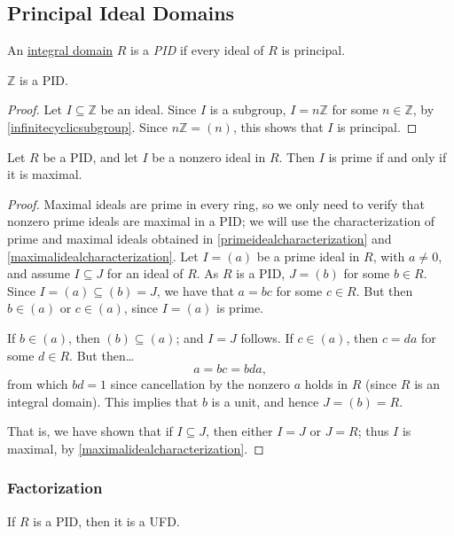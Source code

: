 \subsection{Principal Ideal Domains}\label{principalidealdomains}
An \hyperref[integraldomain]{integral domain} $R$ is a \emph{PID} if every ideal of $R$ is principal.

\begin{proposition}
$\mathbb{Z}$ is a PID.
\end{proposition}

\begin{proof}
Let $I \subseteq \mathbb{Z}$ be an ideal. Since $I$ is a subgroup, $I = n\mathbb{Z}$ for some $n \in \mathbb{Z}$, by
\ref{infinitecyclicsubgroup}. Since $n\mathbb{Z} = (n)$, this shows that $I$ is principal.
\end{proof}

\begin{proposition}
Let $R$ be a PID, and let $I$ be a nonzero ideal in $R$. Then $I$ is prime if and only if it is maximal.
\end{proposition}

\begin{proof}
Maximal ideals are prime in every ring, so we only need to verify that nonzero prime ideals are maximal in a PID;
we will use the characterization of prime and maximal ideals obtained in \ref{primeidealcharacterization} and
\ref{maximalidealcharacterization}. Let $I = (a)$ be a prime ideal in $R$, with $a \neq 0$, and assume $I \subseteq J$
for an ideal of $R$. As $R$ is a PID, $J = (b)$ for some $b \in R$. Since $I = (a) \subseteq (b) = J$, we have that $a=bc$
for some $c \in R$. But then $b \in (a)$ or $c \in (a)$, since $I = (a)$ is prime.

If $b \in (a)$, then $(b) \subseteq (a)$; and $I = J$ follows. If $c \in (a)$, then $c = da$ for some $d \in R$. But then\dots
$$a=bc=bda,$$
from which $bd = 1$ since cancellation by the nonzero $a$ holds in $R$ (since $R$ is an integral domain). This implies that $b$
is a unit, and hence $J = (b) = R$.

That is, we have shown that if $I \subseteq J$, then either $I = J$ or $J = R$; thus $I$ is maximal, by \ref{maximalidealcharacterization}.
\end{proof}

\subsubsection{Factorization}

\begin{proposition}
If $R$ is a PID, then it is a UFD.
\end{proposition}